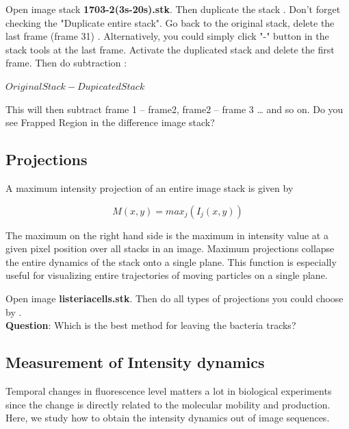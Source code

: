 \begin{indentexercise}{1}
Open image stack \textbf{1703-2(3s-20s).stk}.
Then duplicate the stack .
Don't forget checking the "Duplicate entire stack". 
Go back to the original stack, delete the last frame (frame 31) . Alternatively, you could simply click "-" button in the stack tools at the last frame. 
Activate the duplicated stack and delete the first frame.
Then do subtraction :

\tab $Original Stack - Dupicated Stack$

This will then subtract frame 1 -- frame2, frame2 -- frame 3 \ldots
and so on. Do you see Frapped Region in the difference image stack?
\end{indentexercise}

\subsection{Projections}

A maximum intensity projection of an entire image stack is given by

\begin{equation}
M(x,y) =max_{j}(I_{j}(x,y))
\end{equation}

The maximum on the right hand side is the maximum in intensity value at
a given pixel position over all stacks in an image. Maximum
projections collapse the entire dynamics of the stack onto a single
plane. This function is especially useful for visualizing entire
trajectories of moving particles on a single plane.

\begin{indentexercise}{1}
Open image \textbf{listeriacells.stk}. 
Then do all types of projections you could choose by .\\
\textbf{Question}: Which is the best method for leaving the bacteria tracks? 
\end{indentexercise}

\subsection{Measurement of Intensity dynamics}

Temporal changes in fluorescence level matters a lot in biological
experiments since the change is directly related to the molecular
mobility and production. Here, we study how to obtain the intensity
dynamics out of image sequences.

